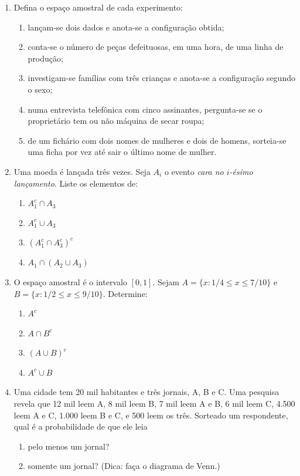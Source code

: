 \documentclass[11pt]{article}
\begin{document}
\begin{enumerate}[label=\textbf{C\arabic*.}, leftmargin=*]
\item Defina o espaço amostral de cada experimento:
\begin{enumerate}[label=(\alph*)]
  \item lançam-se dois dados e anota-se a configuração obtida;
  \item conta-se o número de peças defeituosas, em uma hora, de uma linha de produção;
  \item investigam-se famílias com três crianças e anota-se a configuração segundo o sexo;
  \item numa entrevista telefônica com cinco assinantes, pergunta-se se o proprietário tem ou não máquina de secar roupa;
  \item de um fichário com dois nomes de mulheres e dois de homens, sorteia-se uma ficha por vez até sair o último nome de mulher.
\end{enumerate}
\item Uma moeda é lançada três vezes. Seja $A_i$ o evento \emph{cara no $i$-ésimo lançamento}. Liste os elementos de:
\begin{enumerate}[label=(\alph*)]
  \item $A_1^c \cap A_3$
  \item $A_1^c \cup A_3$
  \item $(A_1^c \cap A_3^c)^c$
  \item $A_1 \cap (A_2 \cup A_3)$
\end{enumerate}
\item O espaço amostral é o intervalo $[0, 1]$. Sejam $A = \{x : 1/4 \leq x \leq 7/10\}$ e $B = \{x : 1/2 \leq x \leq 9/10\}$. Determine:
\begin{enumerate}[label=(\alph*)]
  \item $A^c$
  \item $A \cap B^c$
  \item $(A \cup B)^c$
  \item $A^c \cup B$
\end{enumerate}
\item Uma cidade tem 20 mil habitantes e três jornais, A, B e C. Uma pesquisa revela que 12 mil leem A, 8 mil leem B, 7 mil leem A e B, 6 mil leem C, 4.500 leem A e C, 1.000 leem B e C, e 500 leem os três. Sorteado um respondente, qual é a probabilidade de que ele leia
\begin{enumerate}[label=(\alph*)]
  \item pelo menos um jornal?
  \item somente um jornal? (Dica: faça o diagrama de Venn.)

\end{enumerate}
\end{enumerate}
\end{document}
